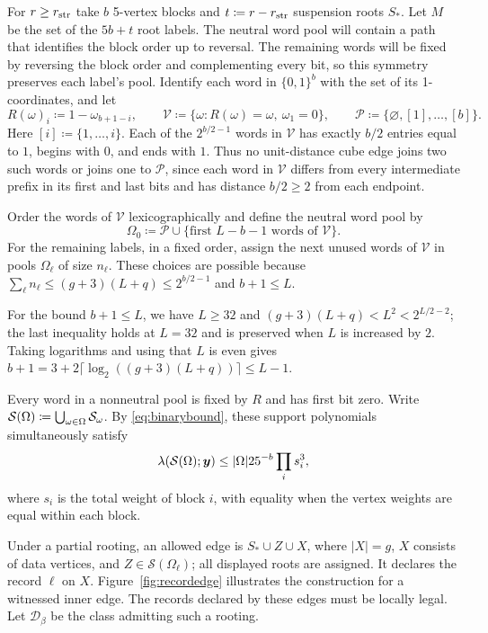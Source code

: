 \documentclass[10pt]{article}
\numberwithin{equation}{section}
\theoremstyle{definition}
\newcommand{\cD}{\mathcal D}\newcommand{\cE}{\mathcal E}\newcommand{\cF}{\mathcal F}
\begin{document}
For $r\ge r_{\rm str}$ take $b$ 5-vertex blocks and $t\coloneqq r-r_{\rm str}$ suspension roots $S_*$. Let $M$ be the set of the $5b+t$ root labels. The neutral word pool will contain a path that identifies the block order up to reversal. The remaining words will be fixed by reversing the block order and complementing every bit, so this symmetry preserves each label's pool. Identify each word in $\{0,1\}^b$ with the set of its 1-coordinates, and let
\[
 R(\omega)_i\coloneqq1-\omega_{b+1-i},\qquad
 \mathcal V\coloneqq\{\omega\colon R(\omega)=\omega,\ \omega_1=0\},\qquad
 \mathcal P\coloneqq\{\varnothing,[1],\ldots,[b]\}.
\]
Here $[i]\coloneqq\{1,\ldots,i\}$. Each of the $2^{b/2-1}$ words in $\mathcal V$ has exactly $b/2$ entries equal to $1$, begins with $0$, and ends with $1$. Thus no unit-distance cube edge joins two such words or joins one to $\mathcal P$, since each word in $\mathcal V$ differs from every intermediate prefix in its first and last bits and has distance $b/2\ge2$ from each endpoint.

Order the words of $\mathcal V$ lexicographically and define the neutral word pool by
\[
 \Omega_0\coloneqq\mathcal P\cup\{\text{first }L-b-1\text{ words of }\mathcal V\}.
\]
For the remaining labels, in a fixed order, assign the next unused words of $\mathcal V$ in pools $\Omega_\ell$ of size $n_\ell$. These choices are possible because $\sum_\ell n_\ell\le(g+3)(L+q)\le2^{b/2-1}$ and $b+1\le L$.

For the bound $b+1\le L$, we have $L\ge32$ and $(g+3)(L+q)<L^2<2^{L/2-2}$; the last inequality holds at $L=32$ and is preserved when $L$ is increased by $2$. Taking logarithms and using that $L$ is even gives $b+1=3+2\lceil\log_2((g+3)(L+q))\rceil\le L-1$.

Every word in a nonneutral pool is fixed by $R$ and has first bit zero. Write $\mathcal S(\Omega)\coloneqq\bigcup_{\omega\in\Omega}\mathcal S_\omega$. By \eqref{eq:binarybound}, these support polynomials simultaneously satisfy
\begin{equation}\label{eq:allcommonmax}
 \lambda(\mathcal S(\Omega);\boldsymbol{y})
       \le |\Omega|25^{-b}\prod_i s_i^3,
\end{equation}
where $s_i$ is the total weight of block $i$, with equality when the vertex weights are equal within each block.

Under a partial rooting, an allowed edge is $S_*\cup Z\cup X$, where $|X|=g$, $X$ consists of data vertices, and $Z\in\mathcal S(\Omega_\ell)$; all displayed roots are assigned. It declares the record $\ell$ on $X$. Figure~\ref{fig:recordedge} illustrates the construction for a witnessed inner edge. The records declared by these edges must be locally legal. Let $\cD_\beta$ be the class admitting such a rooting.
\end{document}
